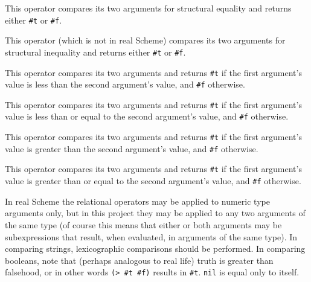 \documentclass[11pt]{article}
\begin{document}
        \vspace{-1.5mm}

        \begin{description}

          \addtolength{\itemsep}{-1.25mm}

          \item[\texttt{=}:] This operator compares its two arguments for
                structural equality and returns either \texttt{\#t} or
                \texttt{\#f}.

          \item[\texttt{<>}:] This operator (which is not in real Scheme)
                compares its two arguments for structural inequality and
                returns either \texttt{\#t} or \texttt{\#f}.

          \item[\texttt{<}:] This operator compares its two arguments and
                returns \texttt{\#t} if the first argument's value is less
                than the second argument's value, and \texttt{\#f}
                otherwise.

          \item[\texttt{<=}:] This operator compares its two arguments and
                returns \texttt{\#t} if the first argument's value is less
                than or equal to the second argument's value, and
                \texttt{\#f} otherwise.

          \item[\texttt{>}:] This operator compares its two arguments and
                returns \texttt{\#t} if the first argument's value is
                greater than the second argument's value, and \texttt{\#f}
                otherwise.

          \item[\texttt{>=}:] This operator compares its two arguments and
                returns \texttt{\#t} if the first argument's value is
                greater than or equal to the second argument's value, and
                \texttt{\#f} otherwise.

        \end{description}

        \vspace{-1.5mm}

        In real Scheme the relational operators may be applied to numeric type
      arguments only, but in this project they may be applied to any two
      arguments of the same type (of course this means that either or both
      arguments may be subexpressions that result, when evaluated, in
      arguments of the same type).  In comparing strings, lexicographic
      comparisons should be performed.  In comparing booleans, note that
      (perhaps analogous to real life) truth is greater than falsehood, or
      in other words \texttt{(> \#t \#f)} results in \texttt{\#t}.
      \texttt{nil} is equal only to itself.
\end{document}
